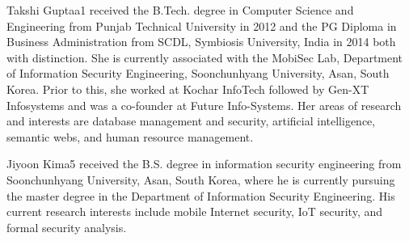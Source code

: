 \documentclass{easychair}
\begin{document}
\vspace*{0.5em}
\begin{biography}{Takshi Gupta}{a1} received the B.Tech. degree in Computer Science and Engineering
from Punjab Technical University in 2012 and the PG Diploma in Business Administration from SCDL, Symbiosis University, India in 2014 both with distinction. She is currently associated with the MobiSec Lab, Department of Information Security Engineering, Soonchunhyang University, Asan, South Korea. Prior to this, she worked at Kochar InfoTech followed by Gen-XT Infosystems and was a co-founder at Future Info-Systems. Her areas of research and interests are database management and security, artificial intelligence, semantic webs, and human resource management.
\end{biography}

\vspace*{0.5em}
\begin{biography}{Jiyoon Kim}{a5} received the B.S. degree in information security engineering from Soonchunhyang University, Asan, South Korea, where he is currently pursuing the master degree in the Department of Information Security Engineering. His current research interests include mobile Internet security, IoT security, and formal security analysis.
\end{biography}
\end{document}
